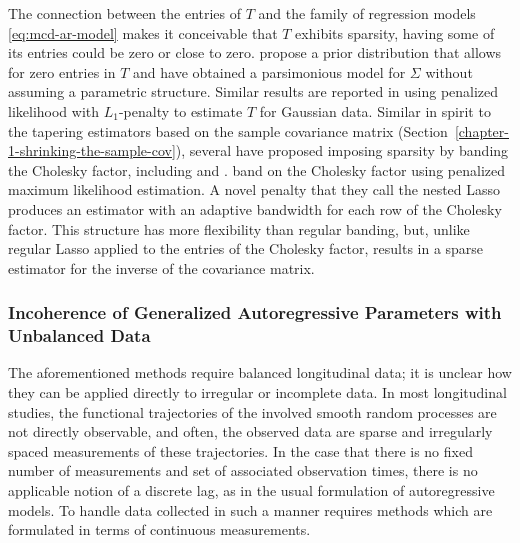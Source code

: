The connection between the entries of $T$ and the family of regression models \eqref{eq:mcd-ar-model} makes it conceivable that $T$  exhibits sparsity, having some of its entries could be zero or close to zero. \cite{smith2002parsimonious} propose a prior distribution that allows for zero entries in $T$ and have obtained a parsimonious model for $\Sigma$ without assuming a parametric structure. Similar results are reported in \cite{huang2006covariance} using penalized likelihood with $L_1$-penalty to estimate $T$ for Gaussian data. Similar in spirit to the tapering estimators based on the sample covariance matrix (Section~\ref{chapter-1-shrinking-the-sample-cov}), several have proposed imposing sparsity by banding the Cholesky factor, including \cite{wu2003nonparametric} and \cite{huang2006covariance}. \cite{levina2008sparse} band on the Cholesky factor using penalized maximum likelihood estimation. A novel penalty that they call the nested Lasso produces an estimator with an adaptive bandwidth for each row of the Cholesky factor. This structure has more flexibility than regular banding, but, unlike regular Lasso applied to the entries of the Cholesky factor, results in a sparse estimator for the inverse of the covariance matrix.

\bigskip

\subsubsection{Incoherence of Generalized Autoregressive Parameters with Unbalanced Data}

The aforementioned methods require balanced longitudinal data; it is unclear how they can be applied directly to irregular or incomplete data. In most longitudinal studies, the functional trajectories of the involved smooth random processes are not directly observable, and often, the observed data are sparse and irregularly spaced measurements of these trajectories. In the case that there is no fixed number of measurements and set of associated observation times, there is no applicable notion of a discrete lag, as in the usual formulation of autoregressive models. To handle data collected in such a manner requires methods which are formulated in terms of continuous measurements.
 
 \bigskip 
 
